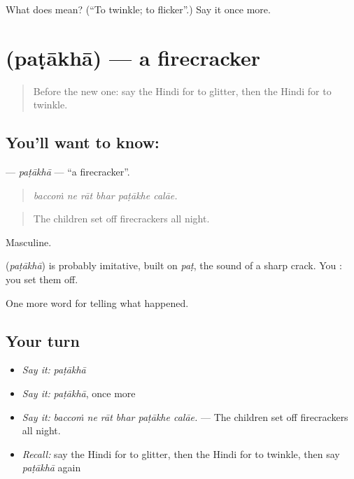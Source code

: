\begin{tcolorbox}[breakable,colback=teal!4,colframe=teal!35!black,title={Before you move on}]
What does  mean? (\textquotedblleft{}To twinkle; to flicker\textquotedblright{}.) Say it once more.
\end{tcolorbox}
\section[\texorpdfstring{\hi{पटाख़ा} (paṭākhā)}{पटाख़ा (paṭākhā)}]{ (paṭākhā) — a firecracker}

\label{lesson:HI-C328-patakha}



\begin{quote}
Before the new one: say the Hindi for to glitter, then the Hindi for to twinkle.
\end{quote}

\subsection*{You'll want to know: }
\textbf{} — \emph{paṭākhā} — \textquotedblleft{}a firecracker\textquotedblright{}.

\begin{quote}
     
\end{quote}

\begin{quote}
\emph{baccoṁ ne rāt bhar paṭākhe calāe.}
\end{quote}

\begin{quote}
The children set off firecrackers all night.
\end{quote}

Masculine.

\begin{cousinweb}
\textbf{} (\emph{paṭākhā}) is probably imitative, built on \emph{paṭ}, the sound of a sharp crack. You \textbf{  }: you set them off.
\end{cousinweb}

\begin{grammarlens}[title={What you've built}]
One more word for telling what happened.
\end{grammarlens}

\subsection*{Your turn}
\begin{itemize}
\raggedright
  \item \emph{Say it:} \emph{paṭākhā}
  \item \emph{Say it:} \emph{paṭākhā}, once more
  \item \emph{Say it:} \emph{baccoṁ ne rāt bhar paṭākhe calāe.} — The children set off firecrackers all night.
  \item \emph{Recall:} say the Hindi for to glitter, then the Hindi for to twinkle, then say \emph{paṭākhā} again
\end{itemize}

